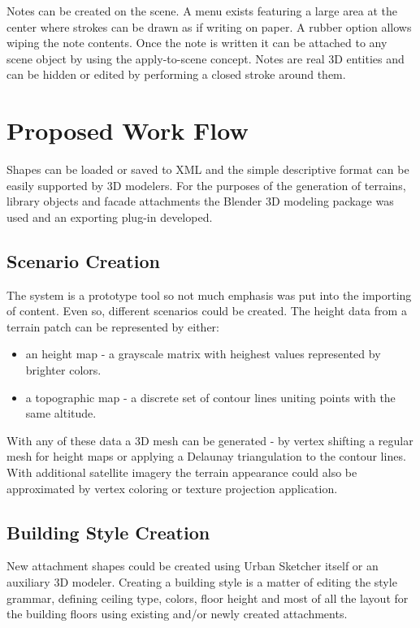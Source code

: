 Notes can be created on the scene. A menu exists featuring a large area at the center where strokes can be drawn as if writing on paper.
A rubber option allows wiping the note contents. Once the note is written it can be attached to any scene object by using the
apply-to-scene concept. Notes are real 3D entities and can be hidden or edited by performing a closed stroke around them.



\section{Proposed Work Flow}

Shapes can be loaded or saved to XML and the simple descriptive format can be easily supported by 3D modelers.
For the purposes of the generation of terrains, library objects and facade attachments the Blender 3D modeling package
was used and an exporting plug-in developed.

\subsection{Scenario Creation}

The system is a prototype tool so not much emphasis was put into the importing of content.
Even so, different scenarios could be created.
The height data from a terrain patch can be represented by either:
\begin{itemize}
	\item an height map - a grayscale matrix with heighest values represented by brighter colors.
	\item a topographic map - a discrete set of contour lines uniting points with the same altitude.
\end{itemize}

With any of these data a 3D mesh can be generated - by vertex shifting a regular mesh for height maps or applying
a Delaunay triangulation to the contour lines.
With additional satellite imagery the terrain appearance could also be approximated by vertex coloring or texture projection application.


\subsection{Building Style Creation}

New attachment shapes could be created using Urban Sketcher itself or an auxiliary 3D modeler.
Creating a building style is a matter of editing the style grammar, defining ceiling type, colors, floor height and most of all
the layout for the building floors using existing and/or newly created attachments.




%

%

%

%

%

%

